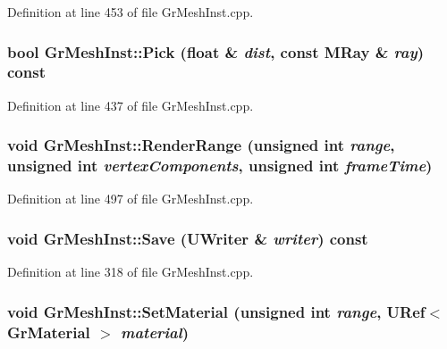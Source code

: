 Definition at line 453 of file GrMeshInst.cpp.\hypertarget{class_gr_mesh_inst_5c7494299c0668f3114a1bccb8722bf2}{
\subsubsection[{Pick}]{\setlength{\rightskip}{0pt plus 5cm}bool GrMeshInst::Pick (float \& {\em dist}, \/  const {\bf MRay} \& {\em ray}) const}}
\label{class_gr_mesh_inst_5c7494299c0668f3114a1bccb8722bf2}




Definition at line 437 of file GrMeshInst.cpp.\hypertarget{class_gr_mesh_inst_ca05d2e8e1fbaecd7902301797a1586b}{
\subsubsection[{RenderRange}]{\setlength{\rightskip}{0pt plus 5cm}void GrMeshInst::RenderRange (unsigned int {\em range}, \/  unsigned int {\em vertexComponents}, \/  unsigned int {\em frameTime})}}
\label{class_gr_mesh_inst_ca05d2e8e1fbaecd7902301797a1586b}




Definition at line 497 of file GrMeshInst.cpp.\hypertarget{class_gr_mesh_inst_9cafeacbe639f49a1e379df6a675cc34}{
\subsubsection[{Save}]{\setlength{\rightskip}{0pt plus 5cm}void GrMeshInst::Save ({\bf UWriter} \& {\em writer}) const}}
\label{class_gr_mesh_inst_9cafeacbe639f49a1e379df6a675cc34}




Definition at line 318 of file GrMeshInst.cpp.\hypertarget{class_gr_mesh_inst_2707fa3259b8562e464c9f538a3b54ff}{
\subsubsection[{SetMaterial}]{\setlength{\rightskip}{0pt plus 5cm}void GrMeshInst::SetMaterial (unsigned int {\em range}, \/  {\bf URef}$<$ {\bf GrMaterial} $>$ {\em material})}}
\label{class_gr_mesh_inst_2707fa3259b8562e464c9f538a3b54ff}




